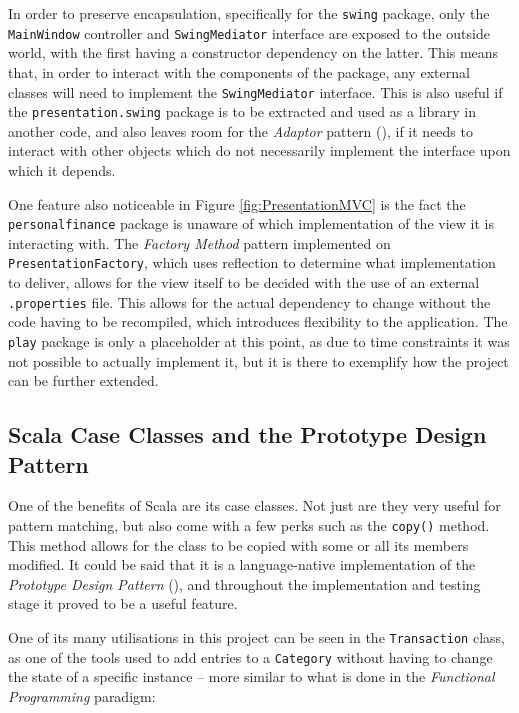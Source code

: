 In order to preserve encapsulation, specifically for the \texttt{swing}
package, only the \texttt{MainWindow} controller and \texttt{SwingMediator}
interface are exposed to the outside world, with the first having a constructor
dependency on the latter. This means that, in order to interact with the
components of the package, any external classes will need to implement the
\texttt{SwingMediator} interface. This is also useful if the
\texttt{presentation.swing} package is to be extracted and used as a library in
another code, and also leaves room for the \emph{Adaptor} pattern
(\cite[][p.~139]{gamma1995design}), if it needs to interact with other objects which do not
necessarily implement the interface upon which it depends.

One feature also noticeable in Figure \ref{fig:PresentationMVC} is the fact the
\texttt{personalfinance} package is unaware of which implementation of the view
it is interacting with. The \emph{Factory Method} pattern implemented on
\texttt{PresentationFactory}, which uses reflection to determine what
implementation to deliver, allows for the view itself to be decided with the
use of an external \texttt{.properties} file. This allows for the actual
dependency to change without the code having to be recompiled, which introduces
flexibility to the application. The \texttt{play} package is only a placeholder
at this point, as due to time constraints it was not possible to actually
implement it, but it is there to exemplify how the project can be further
extended.

\subsection{Scala Case Classes and the Prototype Design Pattern} \label{sec:Reflections.ScalaCaseClasses}
One of the benefits of Scala are its case classes. Not just are they very
useful for pattern matching, but also come with a few perks such as the
\texttt{copy()} method. This method allows for the class to be copied with some
or all its members modified. It could be said that it is a language-native
implementation of the \emph{Prototype Design Pattern}
(\cite[][Ch.~6,~Location~2461]{nikolov2016scala}), and throughout the
implementation and testing stage it proved to be a useful feature.

One of its many utilisations in this project can be seen in the
\texttt{Transaction} class, as one of the tools used to add entries to a
\texttt{Category} without having to change the state of a specific instance --
more similar to what is done in the \emph{Functional Programming} paradigm:
{
  \small
  
}


